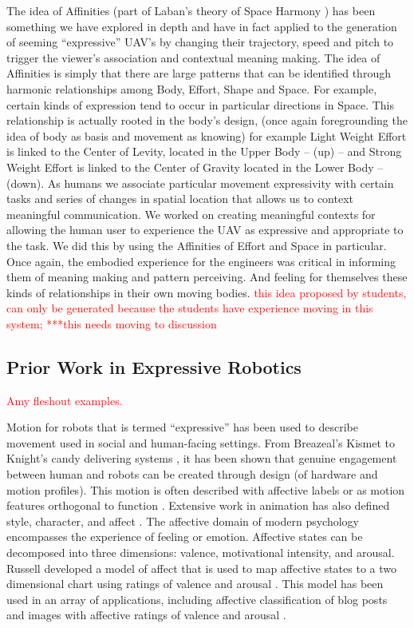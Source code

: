 \documentclass[arts,article,submit,moreauthors,pdftex,10pt,a4paper]{mdpi}
\begin{document}
The idea of Affinities (part of Laban’s theory of Space Harmony \cite{laban1971mastery}) has been something we have explored in depth and have in fact applied to the generation of seeming “expressive” UAV’s by changing their trajectory, speed and pitch to trigger the viewer’s association and contextual meaning making. The idea of Affinities is simply that there are large patterns that can be identified through harmonic relationships among Body, Effort, Shape and Space. For example, certain kinds of expression tend to occur in particular directions in Space. This relationship is actually rooted in the body’s design, (once again foregrounding the idea of body as basis and movement as knowing) for example Light Weight Effort is linked to the Center of Levity, located in the Upper Body -- (up) -- and Strong Weight Effort is linked to the Center of Gravity located in the Lower Body -- (down). As humans we associate particular movement expressivity with certain tasks and series of changes in spatial location that allows us to context meaningful communication. We worked on creating meaningful contexts for allowing the human user to experience the UAV as expressive and appropriate to the task. We did this by using the Affinities of Effort and Space in particular. Once again, the embodied experience for the engineers was critical in informing them of meaning making and pattern perceiving. And feeling for themselves these kinds of relationships in their own moving bodies. \textcolor{red}{this idea proposed by students, can only be generated because the students have experience moving in this system; ***this needs moving to discussion}


\subsection{Prior Work in Expressive Robotics}
\textcolor{red}{Amy fleshout examples.} 

Motion for robots that is termed ``expressive'' has been used to describe movement used in social and human-facing settings.  From Breazeal's Kismet \cite{breazeal2004designing} to Knight's candy delivering systems \cite{knight2015taking}, it has been shown that genuine engagement between human and robots can be created through design (of hardware and motion profiles).  This motion is often described with affective labels \cite{breazeal1999context,knight2012acting,knight2014expressive} or as motion features orthogonal to function \cite{knight2015layering}.  Extensive work in animation has also defined style, character, and affect \cite{chaos,brand2000style,liu2005learning,torresani2007learning,gillies2009learning,etemad2016expert}.  The affective domain of modern psychology encompasses the experience of feeling or emotion.  Affective states can be decomposed into three dimensions: valence, motivational intensity, and arousal. Russell developed a model of affect that is used to map affective states to a two dimensional chart using ratings of valence and arousal \cite{russell1980circumplex}. This model has been used in an array of applications, including affective classification of blog posts \cite{paltoglou2013seeing} and images with affective ratings of valence and arousal \cite{dan2011geneva,kurdi2017introducing}.
\end{document}
